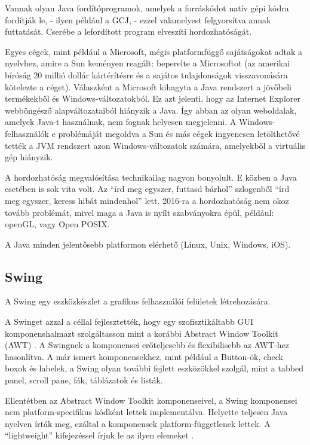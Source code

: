 \documentclass[a4paper,12pt]{report}
\begin{document}
\vspace{2mm}
Vannak olyan Java fordítóprogramok, amelyek a forráskódot natív gépi kódra fordítják le, - ilyen például a GCJ, - ezzel valamelyest felgyorsítva annak futtatását. Cserébe a lefordított program elveszíti hordozhatóságát.

\vspace{2mm}
Egyes cégek, mint például a Microsoft, mégis platformfüggő sajátságokat adtak a nyelvhez, amire a Sun keményen reagált: beperelte a Microsoftot (az amerikai bíróság 20 millió dollár kártérítésre és a sajátos tulajdonságok visszavonására kötelezte a céget). Válaszként a Microsoft kihagyta a Java rendszert a jövőbeli termékekből és Windows-változatokból. Ez azt jelenti, hogy az Internet Explorer webböngésző alapváltozataiból hiányzik a Java. Így abban az olyan weboldalak, amelyek Java-t használnak, nem fognak helyesen megjelenni. A Windows-felhasználók e problémáját megoldva a Sun és más cégek ingyenesen letölthetővé tették a JVM rendszert azon Windows-változatok számára, amelyekből a virtuális gép hiányzik.

\vspace{2mm}
A hordozhatóság megvalósítása technikailag nagyon bonyolult. E közben a Java esetében is sok vita volt. Az ``írd meg egyszer, futtasd bárhol'' szlogenből ``írd meg egyszer, keress hibát mindenhol'' lett. 2016-ra a hordozhatóság nem okoz tovább problémát, mivel maga a Java is nyílt szabványokra épül, például: openGL, vagy Open POSIX.

\vspace{2mm}
A Java minden jelentősebb platformon elérhető (Linux, Unix, Windows, iOS).

\subsection{Swing}
\label{swing}

A Swing egy eszközkészlet a grafikus felhasználói felületek létrehozására.

\vspace{2mm}
A Swinget azzal a céllal fejlesztették, hogy egy szofisztikáltabb GUI komponenshalmazt szolgáltasson mint a korábbi Abstract Window Toolkit (AWT) \cite{awt}. A Swingnek a komponensei erőteljesebb és flexibilisebb az AWT-hez hasonlítva. A már ismert komponensekhez, mint például a Button-ök, check boxok és labelek, a Swing olyan további fejlett eszközökkel szolgál, mint a tabbed panel, scroll pane, fák, táblázatok és listák.

\vspace{2mm}
Ellentétben az Abstract Window Toolkit komponenseivel, a Swing komponensei nem platform-specifikus kódként lettek implementálva. Helyette teljesen Java nyelven írták meg, ezáltal a komponensek platform-függetlenek lettek. A ``lightweight'' kifejezéssel írjuk le az ilyen elemeket \cite{swingarticle}.
\end{document}
